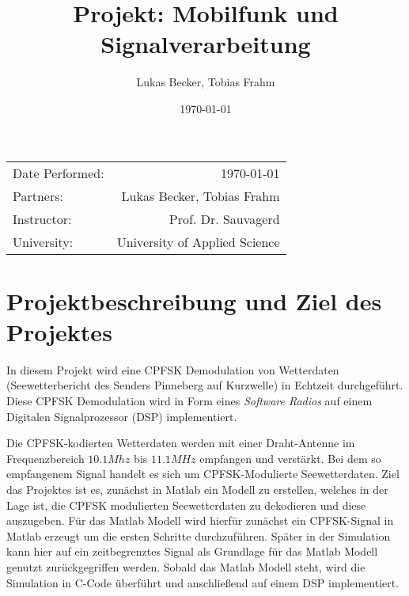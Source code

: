 \documentclass{article}
\title{Projekt: Mobilfunk und Signalverarbeitung} %
\author{Lukas Becker, Tobias Frahm} %
\date{\today} %
\begin{document}
\maketitle %

\begin{center}
\begin{tabular}{l r}
Date Performed: & \today \\ %
Partners: & Lukas Becker, Tobias Frahm \\ %
Instructor: & Prof. Dr. Sauvagerd \\%
University: & University of Applied Science 
\end{tabular}
\end{center}

\begin{acronym}
\end{acronym}



\section{Projektbeschreibung und Ziel des Projektes}

In diesem Projekt wird eine \ac{CPFSK} Demodulation von Wetterdaten 
(Seewetterbericht des  Senders  Pinneberg  auf  Kurzwelle)  in  Echtzeit  durchgeführt. 
Diese  \ac{CPFSK} Demodulation  wird  in  Form  eines  \textit{Software  Radios}  auf  einem  
Digitalen Signalprozessor (DSP) implementiert. 

Die \ac{CPFSK}-kodierten Wetterdaten werden mit einer Draht-Antenne im Frequenzbereich
$10.1Mhz$ bis $11.1MHz$ empfangen und verstärkt. Bei dem so empfangenem Signal handelt es sich um 
\ac{CPFSK}-Modulierte Seewetterdaten. Ziel das Projektes ist es, zunächst in Matlab ein Modell zu erstellen, welches
in der Lage ist, die \ac{CPFSK} modulierten Seewetterdaten zu dekodieren und diese auszugeben. 
Für das Matlab Modell wird hierfür zunächst ein \ac{CPFSK}-Signal in Matlab erzeugt um die ersten 
Schritte durchzuführen. Später in der Simulation kann hier auf ein zeitbegrenztes Signal 
als Grundlage für das Matlab Modell genutzt zurückgegriffen werden. 
Sobald das Matlab Modell steht, wird die Simulation in C-Code überführt und anschließend 
auf einem DSP implementiert.
\end{document}
